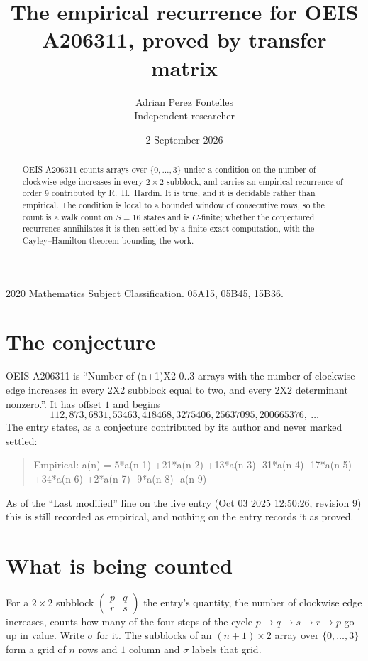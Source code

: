 \documentclass[11pt,a4paper]{article}
\title{The empirical recurrence for OEIS A206311, proved by transfer matrix}
\author{Adrian Perez Fontelles\\ \small Independent researcher}
\date{2 September 2026}
\theoremstyle{plain}
\theoremstyle{definition}
\begin{document}
\maketitle

\begin{abstract}
OEIS A206311 counts arrays over $\{0,\dots,3\}$ under a condition on the number of clockwise edge increases
in every $2\times2$ subblock, and carries an empirical recurrence of order $9$ contributed by
R.~H.~Hardin. It is true, and it is decidable rather than empirical. The condition is local to
a bounded window of consecutive rows, so the count is a walk count on $S=16$ states and is
$C$-finite; whether the conjectured recurrence annihilates it is then settled by a finite exact
computation, with the Cayley--Hamilton theorem bounding the work.
\end{abstract}

\noindent\small 2020 Mathematics Subject Classification. 05A15, 05B45, 15B36.\normalsize

\section{The conjecture}

OEIS A206311 is ``Number of (n+1)X2 0..3 arrays with the number of clockwise edge increases in every 2X2 subblock equal to two, and every 2X2 determinant nonzero.''. It has offset $1$ and begins
\[
112, 873, 6831, 53463, 418468, 3275406, 25637095, 200665376,\ \dots
\]
The entry states, as a conjecture contributed by its author and never marked settled:
\begin{quote}
Empirical: a(n) = 5*a(n-1) +21*a(n-2) +13*a(n-3) -31*a(n-4) -17*a(n-5) +34*a(n-6) +2*a(n-7) -9*a(n-8) -a(n-9)
\end{quote}
As of the ``Last modified'' line on the live entry (Oct 03 2025 12:50:26, revision 9) this is still
recorded as empirical, and nothing on the entry records it as proved.

\section{What is being counted}

For a $2\times2$ subblock $\begin{pmatrix}p&q\\r&s\end{pmatrix}$ the
entry's quantity, the number of clockwise edge increases, counts how many of the four steps of the cycle $p\to q\to s\to r\to p$ go up in value. Write $\sigma$ for it. The subblocks of an
$(n+1)\times2$ array over $\{0,\dots,3\}$ form a grid of $n$ rows and $1$
column and $\sigma$ labels that grid.
\end{document}
